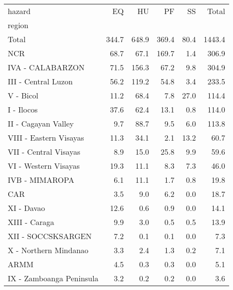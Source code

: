 \begin{tabular}{lrrrrr}
\toprule
hazard &     EQ &     HU &     PF &    SS &   Total \\
region                   &        &        &        &       &         \\
\midrule
Total                    &  344.7 &  648.9 &  369.4 &  80.4 &  1443.4 \\
NCR                      &   68.7 &   67.1 &  169.7 &   1.4 &   306.9 \\
IVA - CALABARZON         &   71.5 &  156.3 &   67.2 &   9.8 &   304.9 \\
III - Central Luzon      &   56.2 &  119.2 &   54.8 &   3.4 &   233.5 \\
V - Bicol                &   11.2 &   68.4 &    7.8 &  27.0 &   114.4 \\
I - Ilocos               &   37.6 &   62.4 &   13.1 &   0.8 &   114.0 \\
II - Cagayan Valley      &    9.7 &   88.7 &    9.5 &   6.0 &   113.8 \\
VIII - Eastern Visayas   &   11.3 &   34.1 &    2.1 &  13.2 &    60.7 \\
VII - Central Visayas    &    8.9 &   15.0 &   25.8 &   9.9 &    59.6 \\
VI - Western Visayas     &   19.3 &   11.1 &    8.3 &   7.3 &    46.0 \\
IVB - MIMAROPA           &    6.1 &   11.1 &    1.7 &   0.8 &    19.8 \\
CAR                      &    3.5 &    9.0 &    6.2 &   0.0 &    18.7 \\
XI - Davao               &   12.6 &    0.6 &    0.9 &   0.0 &    14.1 \\
XIII - Caraga            &    9.9 &    3.0 &    0.5 &   0.5 &    13.9 \\
XII - SOCCSKSARGEN       &    7.2 &    0.1 &    0.1 &   0.0 &     7.3 \\
X - Northern Mindanao    &    3.3 &    2.4 &    1.3 &   0.2 &     7.1 \\
ARMM                     &    4.5 &    0.3 &    0.3 &   0.0 &     5.1 \\
IX - Zamboanga Peninsula &    3.2 &    0.2 &    0.2 &   0.0 &     3.6 \\
\bottomrule
\end{tabular}
